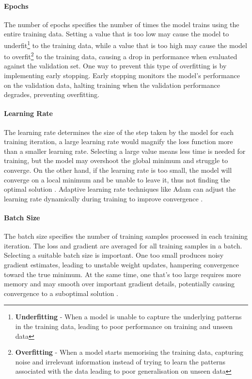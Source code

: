 \paragraph{Epochs} \label{ML:Epochs} The number of epochs specifies the number of times the model trains using the entire training data. Setting a value that is too low may cause the model to underfit\footnote{\textbf{Underfitting} - When a model is unable to capture the underlying patterns in the training data, leading to poor performance on training and unseen data} to the training data, while a value that is too high may cause the model to overfit\footnote{\textbf{Overfitting} - When a model starts memorising the training data, capturing noise and irrelevant information instead of trying to learn the patterns associated with the data leading to poor generalisation on unseen data} to the training data, causing a drop in performance when evaluated against the validation set. One way to prevent this type of overfitting is by implementing early stopping. Early stopping monitors the model's performance on the validation data, halting training when the validation performance degrades, preventing overfitting.

\paragraph{Learning Rate} \label{ML:LearningRate} The learning rate determines the size of the step taken by the model for each training iteration, a large learning rate would magnify the loss function more than a smaller learning rate. Selecting a large value means less time is needed for training, but the model may overshoot the global minimum and struggle to converge. On the other hand, if the learning rate is too small, the model will converge on a local minimum and be unable to leave it, thus not finding the optimal solution \cite{LearningRate}. Adaptive learning rate techniques like Adam can adjust the learning rate dynamically during training to improve convergence \cite{GradientDescentAlgorithms}.


\paragraph{Batch Size} \label{ML:BatchSize} The batch size specifies the number of training samples processed in each training iteration. The loss and gradient are averaged for all training samples in a batch. Selecting a suitable batch size is important. One too small produces noisy gradient estimates, leading to unstable weight updates, hampering convergence toward the true minimum. At the same time, one that's too large requires more memory and may smooth over important gradient details, potentially causing convergence to a suboptimal solution \cite{BatchSizeTooLarge, BatchSizeVariance, DeepLearningGoodfellow}.


